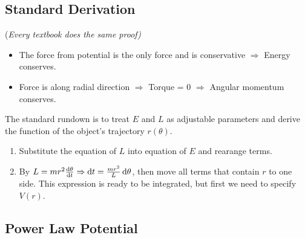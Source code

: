 \documentclass[class=article, crop=false, 12pt]{standalone}
\begin{document}
\subsection{Standard Derivation} 

(\it{Every textbook does the same proof})

\begin{itemize}
    \item The force from potential is the only force and is conservative $\Rightarrow$ Energy conserves.
    \item Force is along radial direction $\Rightarrow$ Torque = 0 $\Rightarrow$ Angular momentum conserves.
\end{itemize}

The standard rundown is to treat $E$ and $L$ as adjustable parameters 
and derive the function of the object's trajectory $r(\theta)$.

\label{standard proof}
\begin{enumerate}
    \item Substitute the equation of $L$ into equation of $E$ and rearange terms.
    \item By $L = mr^2 \dv{\theta}{t} \Rightarrow \dd{t} = \frac{mr^2}{L}\dd{\theta}$, then move all terms that contain $r$ to one side.
    This expression is ready to be integrated, 
    but first we need to specify $V(r)$.
\end{enumerate}


\subsection{Power Law Potential}
\end{document}
